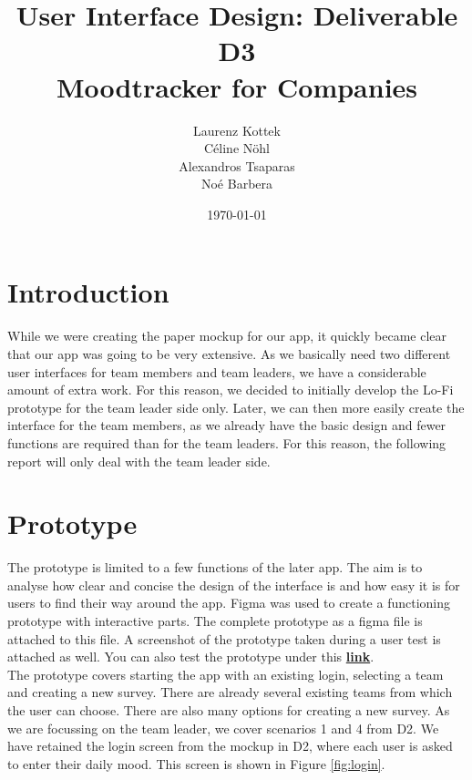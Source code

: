 \documentclass[11pt]{article}
\title{\textbf{User Interface Design: Deliverable D3}\\Moodtracker for Companies}
\author{Laurenz Kottek\\ Céline Nöhl\\ Alexandros Tsaparas\\ Noé Barbera}
\date{\today}
\begin{document}
{}
\maketitle 

\vspace{15mm}


\tableofcontents
\newpage

\section{Introduction}
While we were creating the paper mockup for our app, it quickly became clear that our app was going to be very extensive. As we basically need two different user interfaces for team members and team leaders, we have a considerable amount of extra work. For this reason, we decided to initially develop the Lo-Fi prototype for the team leader side only. Later, we can then more easily create the interface for the team members, as we already have the basic design and fewer functions are required than for the team leaders. For this reason, the following report will only deal with the team leader side.

\section{Prototype}
The prototype is limited to a few functions of the later app. The aim is to analyse how clear and concise the design of the interface is and how easy it is for users to find their way around the app. Figma was used to create a functioning prototype with interactive parts. The complete prototype as a figma file is attached to this file. A screenshot of the prototype taken during a user test is attached as well. You can also test the prototype under this \href{https://www.figma.com/proto/eesoN637wOm4ooDvH1GrsL/Mood-Tracker?type=design&node-id=33-360&t=JI5o14rbvK1Bx76C-0&scaling=min-zoom&page-id=0%3A1&starting-point-node-id=33%3A360}{\textbf{link}}.\\
The prototype covers starting the app with an existing login, selecting a team and creating a new survey. There are already several existing teams from which the user can choose. There are also many options for creating a new survey. As we are focussing on the team leader, we cover scenarios 1 and 4 from D2. We have retained the login screen from the mockup in D2, where each user is asked to enter their daily mood. This screen is shown in Figure \ref{fig:login}.
\end{document}
